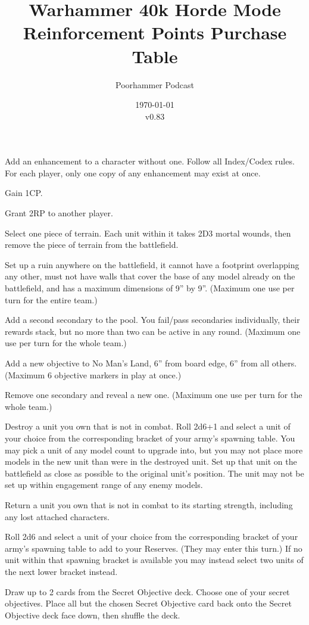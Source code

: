\documentclass{HordeModeTarot}
\title{Warhammer 40k Horde Mode Reinforcement Points Purchase Table}
\author{Poorhammer Podcast}
\date{\today \\v0.83}
\begin{document}
\maketitle

Add an enhancement to a character without one. Follow all Index/Codex rules. For each player, only one copy of any enhancement may exist at once.

Gain 1CP.

Grant 2RP to another player.

Select one piece of terrain. Each unit within it takes 2D3 mortal wounds, then remove the piece of terrain from the battlefield.

Set up a ruin anywhere on the battlefield, it cannot have a footprint overlapping any other, must not have walls that cover the base of any model already on the battlefield, and has a maximum dimensions of 9” by 9”. (Maximum one use per turn for the entire team.)

Add a second secondary to the pool.  You fail/pass secondaries individually, their rewards stack, but no more than two can be active in any round. (Maximum one use per turn for the whole team.)

Add a new objective to No Man’s Land, 6” from board edge, 6” from all others. (Maximum 6 objective markers in play at once.)

Remove one secondary and reveal a new one. (Maximum one use per turn for the whole team.)

Destroy a unit you own that is not in combat. Roll 2d6+1 and select a unit of your choice from the corresponding bracket of your army's spawning table. You may pick a unit of any model count to upgrade into, but you may not place more models in the new unit than were in the destroyed unit. Set up that unit on the battlefield as close as possible to the original unit's position. The unit may not be set up within engagement range of any enemy models.

Return a unit you own that is not in combat to its starting strength, including any lost attached characters.

Roll 2d6 and select a unit of your choice from the corresponding bracket of your army's spawning table to add to your Reserves. (They may enter this turn.)  If no unit within that spawning bracket is available you may instead select two units of the next lower bracket instead.

Draw up to 2 cards from the Secret Objective deck.  Choose one of your secret objectives. Place all but the chosen Secret Objective card back onto the Secret Objective deck face down, then shuffle the deck.
\end{document}
